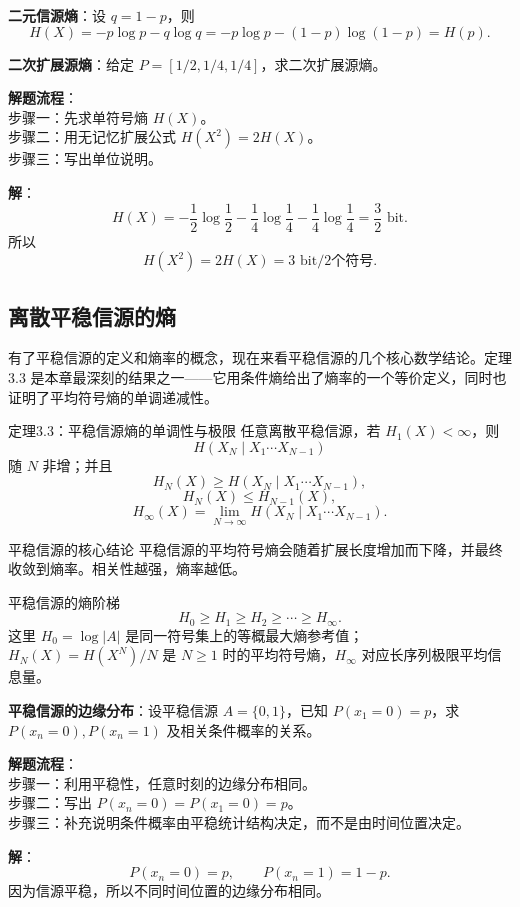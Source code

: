 \begin{example}
\label{ex:ch3-binary-source-entropy}
\textbf{二元信源熵}：设 $q=1-p$，则
\[
H(X)=-p\log p-q\log q=-p\log p-(1-p)\log(1-p)=H(p).
\]
\end{example}

\begin{example}
\label{ex:extension-entropy}
\textbf{二次扩展源熵}：给定 $P=[1/2,1/4,1/4]$，求二次扩展源熵。

\noindent \textbf{解题流程}：\\[2pt]
步骤一：先求单符号熵 $H(X)$。\\
步骤二：用无记忆扩展公式 $H(X^2)=2H(X)$。\\
步骤三：写出单位说明。

\textbf{解}：
\[
H(X)=-\frac12\log\frac12-\frac14\log\frac14-\frac14\log\frac14=\frac32\text{ bit}.
\]
所以
\[
H(X^2)=2H(X)=3\text{ bit/2个符号}.
\]
\end{example}

\subsection{离散平稳信源的熵}

有了平稳信源的定义和熵率的概念，现在来看平稳信源的几个核心数学结论。定理 3.3 是本章最深刻的结果之一——它用条件熵给出了熵率的一个等价定义，同时也证明了平均符号熵的单调递减性。

\begin{theoremBox}{定理3.3：平稳信源熵的单调性与极限}
任意离散平稳信源，若 $H_1(X)<\infty$，则
\[
 H(X_N\mid X_1\cdots X_{N-1})
\]
随 $N$ 非增；并且
\[
 H_N(X)\ge H(X_N\mid X_1\cdots X_{N-1}),
\]
\[
 H_N(X)\le H_{N-1}(X),
\]
\[
 H_\infty(X)=\lim_{N\to\infty}H(X_N\mid X_1\cdots X_{N-1}).
\]
\end{theoremBox}

\begin{keypoint}{平稳信源的核心结论}
平稳信源的平均符号熵会随着扩展长度增加而下降，并最终收敛到熵率。相关性越强，熵率越低。
\end{keypoint}

\begin{formulaBox}{平稳信源的熵阶梯}
\[
 H_0\ge H_1\ge H_2\ge\cdots\ge H_\infty.
\]
这里 $H_0=\log |A|$ 是同一符号集上的等概最大熵参考值；$H_N(X)=H(X^N)/N$ 是 $N\ge1$ 时的平均符号熵，$H_\infty$ 对应长序列极限平均信息量。
\end{formulaBox}

\begin{example}
\label{ex:ch3-stationary-marginal}
\textbf{平稳信源的边缘分布}：设平稳信源 $A=\{0,1\}$，已知 $P(x_1=0)=p$，求 $P(x_n=0),P(x_n=1)$ 及相关条件概率的关系。

\noindent \textbf{解题流程}：\\[2pt]
步骤一：利用平稳性，任意时刻的边缘分布相同。\\
步骤二：写出 $P(x_n=0)=P(x_1=0)=p$。\\
步骤三：补充说明条件概率由平稳统计结构决定，而不是由时间位置决定。

\textbf{解}：
\[
P(x_n=0)=p,\qquad P(x_n=1)=1-p.
\]
因为信源平稳，所以不同时间位置的边缘分布相同。
\end{example}

